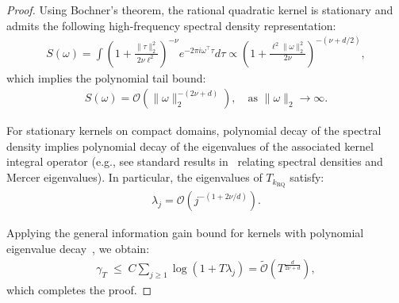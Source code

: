\documentclass[final,12pt]{colt2026} %
\begin{document}
\begin{proof}
Using Bochner's theorem, the rational quadratic kernel is stationary and admits the following high-frequency spectral density
representation:
\begin{align}
\label{eq:rq-gamma-1}
S(\omega) =\int \left(1 + \frac{\|\tau\|^2_2}{2\nu\ell^2}\right)^{-\nu} e^{-2\pi i \omega^{\top} \tau} d\tau
\propto
\left(1 + \frac{\ell^2\|\omega\|^2_2}{2\nu}\right)^{-(\nu+ d/2)},
\end{align}
which implies the polynomial tail bound:
\begin{align}
\label{eq:rq-gamma-2}
S(\omega) = \mathcal O\!\left(\|\omega\|^{-(2\nu+ d)}_2\right),
\quad \text{as } \|\omega\|_2\to\infty.
\end{align}

For stationary kernels on compact domains, polynomial decay of the spectral
density implies polynomial decay of the eigenvalues of the associated kernel
integral operator (e.g., see standard results in~\cite{bach2017equivalence} relating spectral densities and
Mercer eigenvalues).
In particular, the eigenvalues of $T_{k_{\mathrm{RQ}}}$ satisfy:
\begin{align}
\label{eq:rq-gamma-3}
\lambda_j
=
\mathcal O\!\left(j^{-(1 + 2\nu/d)}\right).
\end{align}

Applying the general information gain bound for kernels with polynomial
eigenvalue decay~\citep{vakili21a}, we obtain:
\begin{align}
\label{eq:rq-gamma-4}
\gamma_T
\;\le\;
C \sum_{j\ge1} \log(1 + T \lambda_j)
=
\mathcal{\tilde O}\!\left(T^{\frac{d}{2\nu+ d}}\right),
\end{align}
which completes the proof.
\end{proof}


\end{document}
